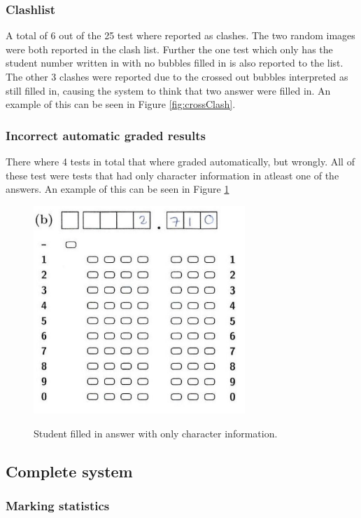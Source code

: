 \subsubsection{Clashlist}

A total of 6 out of the 25 test where reported as clashes. The two random images were both reported in the clash list. Further the one test which only has the student number written in with no bubbles filled in is also reported to the list. The other 3 clashes were reported due to the crossed out bubbles interpreted as still filled in, causing the system to think that two answer were filled in. An example of this can be seen in Figure \ref{fig:crossClash}.

\subsubsection{Incorrect automatic graded results}

There where 4 tests in total that where graded automatically, but wrongly. All of these test were tests that had only character information in atleast one of the answers. An example of this can be seen in Figure \ref{fig:OnlyCharacters}

\begin{figure}
  \centering
  \includegraphics[width=8cm]{OnlyCharacters}\\
  \caption{Student filled in answer with only character information.}
  \label{fig:OnlyCharacters}
\end{figure}

\subsection{Complete system}

\subsubsection{Marking statistics}

